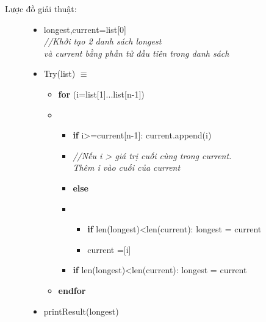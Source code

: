 \begin{enumerate}
\begin{description}
        \item[Lược đồ giải thuật:] 
        \item[] 
        \colorbox{mygrey}{\parbox{14.5cm}{
                    \begin{itemize}
                        \item[] longest,current=list[0] \\
                        \textit{//Khởi tạo 2 danh sách longest \\ và current bằng phần tử đầu tiên trong danh sách}
                        \item [] Try(list) $\equiv$
                            \begin{itemize}
                                \item [] \textbf{for} (i=list[1]...list[n-1])
                                \item []
                                    \begin{itemize}
                                        \item[] \textbf{if} i>=current[n-1]: current.append(i) 
                                        \item[]\textit{//Nếu i > giá trị cuối cùng trong current. \\
                                            Thêm i vào cuối của current}
                                        \item[] \textbf{else}
                                        \item[] 
                                        \begin{itemize}
                                            \item [] \textbf{if} len(longest)<len(current): longest = current
                                            \item [] current =[i]
                                        \end{itemize}
                                        \item [] \textbf{if} len(longest)<len(current): longest = current
                                    \end{itemize}
                                    \item [] \textbf{endfor}
                            \end{itemize}
                            
                        \item [] printResult(longest)
                    \end{itemize}
                    }
                }
    \end{description}



\end{enumerate}
